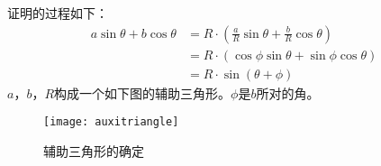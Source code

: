 \begin{ExampleBox}
 证明的过程如下：
 \tcblower
 \begin{align*}
 a\sin\theta+b\cos\theta &= R\cdot \left( \frac{a}{R}\sin\theta + \frac{b}{R}\cos\theta \right)\\
 						&= R\cdot \left(\cos \phi \sin \theta +\sin \phi \cos \theta \right)\\
 						&=R\cdot \sin(\theta+\phi)
 \end{align*}
 $a$，$b$，$R$构成一个如下图的辅助三角形。$\phi$是$b$所对的角。
 \begin{figure}[H]
 \centering
 \texttt{[image: auxitriangle]}
 \caption{辅助三角形的确定}
 \end{figure}
 
\end{ExampleBox}


